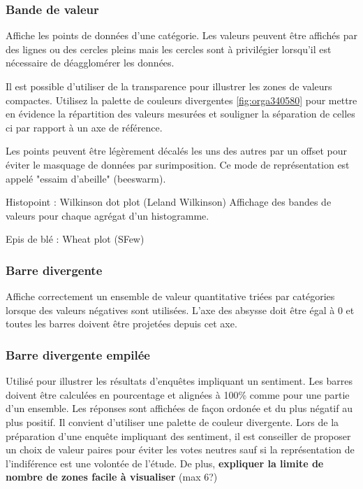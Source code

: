 \documentclass[a4paper,12pt]{article}
\begin{document}
\begin{multicols}{2}
\subsubsection*{Bande de valeur}
\label{sec:orgf421f00}
Affiche les points de données d'une catégorie.\autocite{jonathanschwabishDistribution2021} Les valeurs peuvent être affichés par des lignes ou des cercles pleins mais les cercles sont à privilégier lorsqu'il est nécessaire de déagglomérer les données.

Il est possible d'utiliser de la transparence pour illustrer les zones de valeurs compactes. \autocite{jonathanschwabishDistribution2021} Utilisez la palette de couleurs divergentes \ref{fig:orga340580} pour mettre en évidence la répartition des valeurs mesurées et souligner la séparation de celles ci par rapport à un axe de référence.\autocite{jonathanschwabishDistribution2021}

Les points peuvent être légèrement décalés les uns des autres par un offset pour éviter le masquage de données par surimposition. Ce mode de représentation est appelé "essaim d'abeille" (beeswarm). \autocite{jonathanschwabishDistribution2021}

Histopoint : Wilkinson dot plot (Leland Wilkinson) Affichage des bandes de valeurs pour chaque agrégat d'un histogramme.\autocite{jonathanschwabishDistribution2021}

Epis de blé : Wheat plot (SFew)
\subsubsection*{Barre divergente}
\label{sec:orgf09fc90}
Affiche correctement un ensemble de valeur quantitative triées par catégories lorsque des valeurs négatives sont utilisées. \autocite{alansmithLexiqueVisuel} L'axe des absysse doit être égal à 0 et toutes les barres doivent être projetées depuis cet axe.
\subsubsection*{Barre divergente empilée}
\label{sec:orgfc652d7}
Utilisé pour illustrer les résultats d'enquêtes impliquant un sentiment. \autocite{alansmithLexiqueVisuel} Les barres doivent être calculées en pourcentage et alignées à 100\% comme pour une partie d'un ensemble. Les réponses sont affichées de façon ordonée et du plus négatif au plus positif. Il convient d'utiliser une palette de couleur divergente. Lors de la préparation d'une enquête impliquant des sentiment, il est conseiller de proposer un choix de valeur paires pour éviter les votes neutres sauf si la représentation de l'indiférence est une volontée de l'étude. De plus, \textbf{expliquer la limite de nombre de zones facile à visualiser} (max 6?)

\end{multicols}
\end{document}
